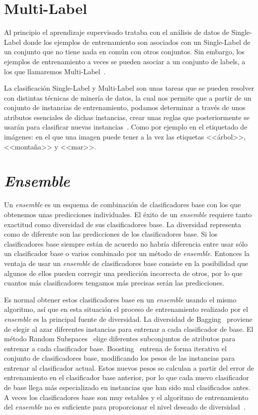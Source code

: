 \section{Multi-Label}
Al principio el aprendizaje supervisado trataba con el análisis de datos de Single-Label donde los ejemplos de entrenamiento son asociados con un Single-Label de un conjunto que no tiene nada en común con otros conjuntos. Sin embargo, los ejemplos de entrenamiento a veces se pueden asociar a un conjunto de labels, a los que llamaremos Multi-Label~\cite{multilabel2}.

La clasificación Single-Label y Multi-Label son unas tareas que se pueden resolver con distintas técnicas de minería de datos, la cual nos permite que a partir de un conjunto de instancias de entrenamiento, podamos determinar a través de unos atributos esenciales de dichas instancias, crear unas reglas que posteriormente se usarán para clasificar nuevas instancias~\cite{multilabel}. Como por ejemplo en el etiquetado de imágenes: en el que una imagen puede tener a la vez las etiquetas <<árbol>>, <<montaña>> y <<mar>>.   

\section{\textit{Ensemble}}
Un \textit{ensemble} es un esquema de combinación de clasificadores base con los que obtenemos unas predicciones individuales. El éxito de un \textit{ensemble} requiere tanto exactitud como diversidad de sus clasificadores base. La diversidad representa como de diferente son las predicciones de los clasificadores base. Si los clasificadores base siempre están de acuerdo no habría diferencia entre usar sólo un clasificador base o varios combinado por un método de \textit{ensemble}. Entonces la ventaja de usar un \textit{ensemble} de clasificadores base consiste en la posibilidad que algunos de ellos pueden corregir una predicción incorrecta de otros, por lo que cuantos más clasificadores tengamos más precisas serán las predicciones. 

Es normal obtener estos clasificadores base en un \textit{ensemble} usando el mismo algoritmo, así que en esta situación el proceso de entrenamiento realizado por el \textit{ensemble} es la principal fuente de diversidad. La diversidad de Bagging~\cite{bagging} proviene de elegir al azar diferentes instancias para entrenar a cada clasificador de base. El método Random Subspaces~\cite{randomsubspace} elige diferentes subconjuntos de atributos para entrenar a cada clasificador base. Boosting~\cite{boosting} entrena de forma iterativa el conjunto de clasificadores base, modificando los pesos de las instancias para entrenar al clasificador actual. Estos nuevos pesos se calculan a partir del error de entrenamiento en el clasificador base anterior, por lo que cada nuevo clasificador de base llega más especializado en instancias que han sido mal clasificados antes. A veces los clasificadores base son muy estables y el  algoritmo de entrenamiento del \textit{ensemble} no es suficiente para proporcionar el nivel deseado de diversidad~\cite{disturbingneighbors}.


